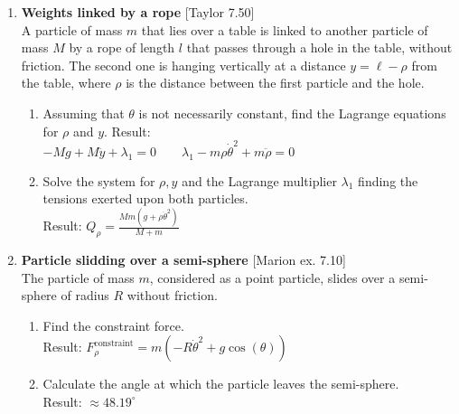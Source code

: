 \documentclass[11pt, a4paper, twoside]{article}
\begin{document}
\begin{enumerate}
	\item
	\begin{minipage}[t][6cm]{0.65\textwidth}
		\textbf{Weights linked by a rope} [Taylor 7.50]\\
		A particle of mass \(m\) that lies over a table is linked to another particle of mass \(M\) by a rope of length \(l\) that passes through a hole in the table, without friction.
		The second one is hanging vertically at a distance \(y = \ell - \rho\) from the table, where \(\rho\) is the distance between the first particle and the hole.
		\begin{enumerate}
			\item Assuming that \(\theta\) is not necessarily constant, find the Lagrange equations for \(\rho\) and \(y\). Result:\\ \(- M g + M \ddot{y} + \lambda_{1} = 0 \qquad \lambda_{1} - m \rho \dot{\theta}^{2} + m \ddot{\rho} = 0\)
			\item Solve the system for \(\rho, y\) and the Lagrange multiplier \(\lambda_1\) finding the tensions exerted upon both particles.\\
			Result: \(Q_{\rho} = \frac{M m \left(g + \rho \dot{\theta}^{2}\right)}{M + m}\)
		\end{enumerate}
	\end{minipage}
	\begin{minipage}[c][0cm][t]{0.3\textwidth}
		
	\end{minipage}


	\item
	\begin{minipage}[t][4.5cm]{0.62\textwidth}
		\textbf{Particle slidding over a semi-sphere} [Marion ex. 7.10]\\
		The particle of mass \(m\), considered as a point particle, slides over a semi-sphere of radius \(R\) without friction.
		\begin{enumerate}
			\item Find the constraint force.\\
			Result: \(F^\mathrm{constraint}_{\rho} = m \left(- R \dot{\theta}^{2} + g \cos{\left(\theta \right)}\right)\)
			\item Calculate the angle at which the particle leaves the semi-sphere.\\
			Result: \(\approx 48.19^\circ\) 
		\end{enumerate}
	\end{minipage}
	\begin{minipage}[c][0cm][t]{0.3\textwidth}
		
	\end{minipage}
	

\end{enumerate}
\end{document}
